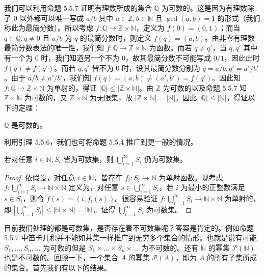 我们可以利用命题 5.5.7 证明有理数所成的集合 $\mathbb{Q}$ 为可数的。这是因为有理数除了 0 以外都可以唯一写成 $a/b$ 其中 $a \in \mathbb{Z}, b \in \mathbb{N}$ 且 $\gcd(a, b) = 1$ 的形式（我们称此为最简分数）。所以考虑 $f : \mathbb{Q} \to \mathbb{Z} \times \mathbb{N}$，定义为 $f(0) = (0, 1)$；而当 $q \in \mathbb{Q}, q \neq 0$ 且 $a/b$ 为 $q$ 的最简分数时，则定义 $f(q) = (a, b)$。由非零有理数最简分数表法的唯一性，我们知 $f : \mathbb{Q} \to \mathbb{Z} \times \mathbb{N}$ 为函数。而若 $q \neq q'$，当 $q, q'$ 其中有一个为 0 时，我们知道另一个不为 0，故其最简分数不可能写成 $0/1$，因此此时 $f(q) \neq f(q')$。而若 $q, q'$ 皆不为 0 时，设其最简分数分别为 $q = a/b, q' = a'/b'$。由于 $a/b \neq a'/b'$，我们知 $f(q) = (a, b) \neq (a', b') = f(q')$。因此知 $f : \mathbb{Q} \to \mathbb{Z} \times \mathbb{N}$ 为单射的，得证 $|\mathbb{Q}| \leq |\mathbb{Z} \times \mathbb{N}|$。由 $\mathbb{Z}$ 为可数的以及命题 5.5.7 知 $\mathbb{Z} \times \mathbb{N}$ 为可数的，又 $\mathbb{Z} \times \mathbb{N}$ 为无限集，故 $|\mathbb{Z} \times \mathbb{N}| = |\mathbb{N}|$。因此 $|\mathbb{Q}| \leq |\mathbb{N}|$，得证以下的定理：

\begin{corollary}
$\mathbb{Q}$ 是可数的。
\end{corollary}

利用引理 5.5.6，我们也可将命题 5.5.4 推广到更一般的情况。

\begin{proposition}
若对任意 $i \in \mathbb{N}, S_i$ 皆为可数集，则 $\bigcup_{i=1}^\infty S_i$ 仍为可数集。
\end{proposition}

\begin{proof}
依假设，对任意 $i \in \mathbb{N}$，皆存在 $f_i : S_i \to \mathbb{N}$ 为单射函数。现考虑 $f : \bigcup_{i=1}^\infty S_i \to \mathbb{N} \times \mathbb{N}$ 定义为，对任意 $s \in \bigcup_{i=1}^\infty S_i$，若 $i$ 为最小的正整数满足 $s \in S_i$，则令 $f(s) = (i, f_i(s))$。很容易验证 $f : \bigcup_{i=1}^\infty S_i \to \mathbb{N} \times \mathbb{N}$ 为单射的，即 $|\bigcup_{i=1}^\infty S_i| \leq |\mathbb{N} \times \mathbb{N}| = |\mathbb{N}|$。证得 $\bigcup_{i=1}^\infty S_i$ 为可数集。
\end{proof}

目前我们处理的都是可数集，是否存在着不可数集呢？答案是肯定的。例如命题 5.5.7 中笛卡儿积并不能如并集一样推广到无穷多个集合的情形。也就是说有可能 $S_1, \dots, S_n, \dots$ 为可数的但是 $S_1 \times \dots \times S_n \times \dots$ 为不可数的。还有 $\mathbb{N}$ 的幂集 $\mathcal{P}(\mathbb{N})$ 也是不可数的。回顾一下，一个集合 $A$ 的幂集 $\mathcal{P}(A)$，即为 $A$ 的所有子集所成的集合。首先我们有以下的结果。


